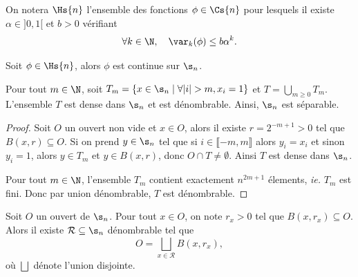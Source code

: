   \begin{definition}
    \label{def:holder_fn_set}
    \leanok
    On notera $\Hs{n}$ l'ensemble des fonctions $\phi \in \Cs{n}$ pour lesquels il existe $\alpha \in ]0, 1[$ et $b > 0$ vérifiant
    $$\forall k \in \N, \hspace{1em} \var_k(\phi) \leq b\alpha^k.$$
  \end{definition}

  \begin{proposition}
    \label{prop:holder_imp_continuous}
    \leanok
    Soit $\phi \in \Hs{n}$, alors $\phi$ est continue sur $\s_n$.
  \end{proposition}


  \begin{proposition}
    \label{prop:separable}
    \leanok
    Pour tout $m \in \N$, soit $T_m = \left\{x \in \s_n \mid \forall|i|>m, x_i=1\right\}$ et $T = \bigcup_{m\geq 0}{T_m}$.
    L'ensemble $T$ est dense dans $\s_n$ et est dénombrable. Ainsi, $\s_n$ est séparable.
  \end{proposition}

  \begin{proof}
    \leanok
    Soit $O$ un ouvert non vide et $x \in O$, alors il existe $r = 2^{-m+1} > 0$ tel que $B(x, r) \subseteq O$.
    Si on prend $y \in \s_n$ tel que si $i \in \llbracket -m, m \rrbracket$ alors $y_i = x_i$ et sinon $y_i = 1$,
    alors $y \in T_m$ et $y \in B(x, r)$, donc $O \cap T \not= \emptyset$. Ainsi $T$ est dense dans $\s_n$.

    Pour tout $m \in \N$, l'ensemble $T_m$ contient exactement $n^{2m+1}$ élements, \textit{ie.} $T_m$ est fini.
    Donc par union dénombrable, $T$ est dénombrable.
  \end{proof}

  \begin{proposition}
    \label{prop:boules}
    \leanok
    Soit $O$ un ouvert de $\s_n$. Pour tout $x \in O$, on note $r_x > 0$ tel que $B(x, r_x) \subseteq O$.
    Alors il existe $\mathcal R \subseteq \s_n$ dénombrable tel que
    $$O = \bigsqcup_{x\in\mathcal R}{B(x, r_x)},$$
    où $\bigsqcup$ dénote l'union disjointe.
  \end{proposition}

